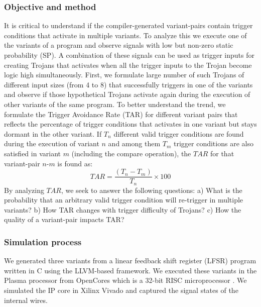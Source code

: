 \documentclass[conference]{IEEEtran}
\begin{document}
\subsubsection{Objective and method}
It is critical to understand if the compiler-generated variant-pairs contain trigger conditions that activate in multiple variants. 
To analyze this we execute one of the variants of a program and observe signals with low but non-zero static probability (SP). 
A combination of these signals can be used as trigger inputs for creating Trojans that activates when all the trigger inputs to the Trojan become logic high simultaneously. First, we formulate large number of such Trojans of different input sizes (from 4 to 8) that successfully triggers in one of the variants and observe if those hypothetical Trojans activate again during the execution of other variants of the same program.
To better understand the trend, we formulate the Trigger Avoidance Rate (TAR) for different variant pairs that reflects the percentage of trigger conditions that activates in one variant but stays dormant in the other variant. If $T_{n}$ different valid trigger conditions are found during the execution of  variant $n$ and among them $T_{m}$ trigger conditions are also satisfied in  variant $m$ (including the compare operation), the $TAR$ for that variant-pair $n$-$m$ is found as: $$TAR= \dfrac{(T_{n} -T_{m})}{T_{n}}\times100$$ 
By analyzing $TAR$, we seek to answer the following questions:
a) What is the probability that an arbitrary valid trigger condition will re-trigger in multiple variants?
b) How TAR changes with trigger difficulty of Trojans?
c) How the quality of a variant-pair impacts TAR?

\subsubsection{Simulation process}
We generated three variants from a linear feedback shift register (LFSR) program written in C using the LLVM-based framework. 
We executed these variants in the Plasma processor from OpenCores which is a 32-bit RISC microprocessor \cite{plasma}. We simulated the IP core in Xilinx Vivado and captured the signal states of the internal wires.
\end{document}

